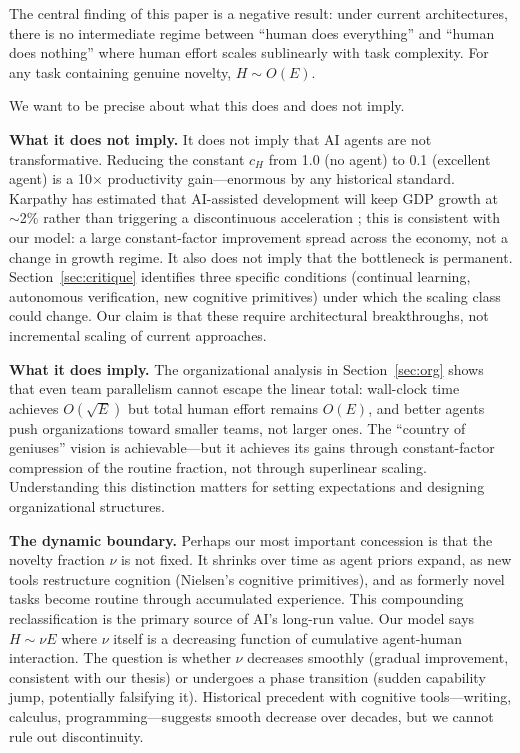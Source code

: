\documentclass[11pt,a4paper]{article}
\begin{document}
The central finding of this paper is a negative result: under current architectures, there is no intermediate regime between ``human does everything'' and ``human does nothing'' where human effort scales sublinearly with task complexity. For any task containing genuine novelty, $H \sim O(E)$.

We want to be precise about what this does and does not imply.

\textbf{What it does not imply.} It does not imply that AI agents are not transformative. Reducing the constant $c_H$ from 1.0 (no agent) to 0.1 (excellent agent) is a 10$\times$ productivity gain---enormous by any historical standard. Karpathy has estimated that AI-assisted development will keep GDP growth at $\sim$2\% rather than triggering a discontinuous acceleration \citep{karpathy2025verify}; this is consistent with our model: a large constant-factor improvement spread across the economy, not a change in growth regime. It also does not imply that the bottleneck is permanent. Section~\ref{sec:critique} identifies three specific conditions (continual learning, autonomous verification, new cognitive primitives) under which the scaling class could change. Our claim is that these require architectural breakthroughs, not incremental scaling of current approaches.

\textbf{What it does imply.} The organizational analysis in Section~\ref{sec:org} shows that even team parallelism cannot escape the linear total: wall-clock time achieves $O(\sqrt{E})$ but total human effort remains $O(E)$, and better agents push organizations toward smaller teams, not larger ones. The ``country of geniuses'' vision is achievable---but it achieves its gains through constant-factor compression of the routine fraction, not through superlinear scaling. Understanding this distinction matters for setting expectations and designing organizational structures.

\textbf{The dynamic boundary.} Perhaps our most important concession is that the novelty fraction $\nu$ is not fixed. It shrinks over time as agent priors expand, as new tools restructure cognition (Nielsen's cognitive primitives), and as formerly novel tasks become routine through accumulated experience. This compounding reclassification is the primary source of AI's long-run value. Our model says $H \sim \nu E$ where $\nu$ itself is a decreasing function of cumulative agent-human interaction. The question is whether $\nu$ decreases smoothly (gradual improvement, consistent with our thesis) or undergoes a phase transition (sudden capability jump, potentially falsifying it). Historical precedent with cognitive tools---writing, calculus, programming---suggests smooth decrease over decades, but we cannot rule out discontinuity.
\end{document}
